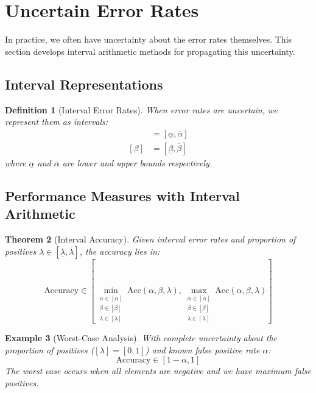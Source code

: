 \documentclass[11pt,final,hidelinks]{article}
\newtheorem{theorem}{Theorem}[section]
\newtheorem{definition}[theorem]{Definition}
\newtheorem{example}[theorem]{Example}
\newcommand{\fprate}{\alpha}
\newcommand{\fnrate}{\beta}
\newcommand{\Interval}[2]{[#1, #2]}
\begin{document}
\section{Uncertain Error Rates}

In practice, we often have uncertainty about the error rates themselves. This section develops interval arithmetic methods for propagating this uncertainty.

\subsection{Interval Representations}

\begin{definition}[Interval Error Rates]
When error rates are uncertain, we represent them as intervals:
\begin{align}
[\fprate] &= \Interval{\underline{\fprate}}{\overline{\fprate}} \\
[\fnrate] &= \Interval{\underline{\fnrate}}{\overline{\fnrate}}
\end{align}
where $\underline{\fprate}$ and $\overline{\fprate}$ are lower and upper bounds respectively.
\end{definition}

\subsection{Performance Measures with Interval Arithmetic}

\begin{theorem}[Interval Accuracy]
Given interval error rates and proportion of positives $\lambda \in [\underline{\lambda}, \overline{\lambda}]$, the accuracy lies in:
\begin{equation}
\text{Accuracy} \in \left[\min_{\substack{\fprate \in [\fprate] \\ \fnrate \in [\fnrate] \\ \lambda \in [\lambda]}} \text{Acc}(\fprate, \fnrate, \lambda), \max_{\substack{\fprate \in [\fprate] \\ \fnrate \in [\fnrate] \\ \lambda \in [\lambda]}} \text{Acc}(\fprate, \fnrate, \lambda)\right]
\end{equation}
\end{theorem}

\begin{example}[Worst-Case Analysis]
With complete uncertainty about the proportion of positives ($[\lambda] = [0,1]$) and known false positive rate $\fprate$:
\begin{equation}
\text{Accuracy} \in [1-\fprate, 1]
\end{equation}
The worst case occurs when all elements are negative and we have maximum false positives.
\end{example}
\end{document}
